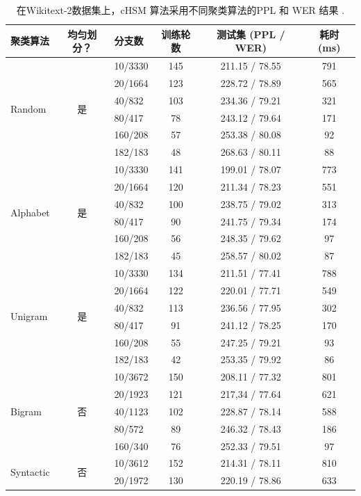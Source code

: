 \begin{table}[t]
  \centering
  \caption{在Wikitext-2数据集上，cHSM 算法采用不同聚类算法的PPL 和 WER 结果 .\label{table:clustering}}
  \begin{tabular}{lclccc} \toprule
聚类算法 & 均匀划分？&分支数& 训练轮数& 测试集 (PPL / WER)&耗时 (ms)\\ \midrule
  \multirow{6}{*}{Random}  &\multirow{6}{*}{是}&10/3330&145&211.15 / 78.55 &791\\
    &&20/1664&123&228.72 / 78.89&565\\
    &&40/832&103&234.36 / 79.21&321\\
    &&80/417&78&243.12 / 79.64&171\\
    &&160/208 &57&253.38 / 80.08&92\\
    &&182/183&48&268.63 / 80.11&88\\
  \midrule
  \multirow{6}{*}{Alphabet}  &\multirow{6}{*}{是}&10/3330 &141&199.01 / 78.07 &773\\
    &&20/1664 &120&211.34 / 78.23&551\\
    &&40/832 &100&238.75 / 79.02&313\\
    &&80/417 &90&241.75 / 79.34&174\\
    &&160/208 &56&248.35 / 79.62&97\\
    &&182/183&45&258.57 / 80.02&87\\
  \midrule
  \multirow{6}{*}{Unigram}   &\multirow{6}{*}{是} &10/3330&134&211.51 / 77.41 &788\\
    & &20/1664&122&220.01 / 77.71&549\\
    & &40/832&113&236.56 / 77.95&302\\
    & &80/417&91& 241.12 / 78.25&170\\
    & &160/208&55&247.25 / 79.21&93\\
    & &182/183&42&253.35 / 79.92&86\\
  \midrule
  \multirow{5}{*}{Bigram}   &\multirow{5}{*}{否}&10/3672&150&208.11 / 77.32&801\\
     &&20/1923&121&217,34 / 77.64&621\\
     &&40/1123&102&228.87 / 78.14&588\\
     &&80/572&89&246.32 / 78.43&186\\
     &&160/340&76&252.33 / 79.51&97\\
  \midrule
  \multirow{5}{*}{Syntactic}  &\multirow{5}{*}{否}&10/3612 &152&214.31 / 78.11&810\\
    &&20/1972 &130&220.19 / 78.86&633\\

\end{tabular}
\end{table}
